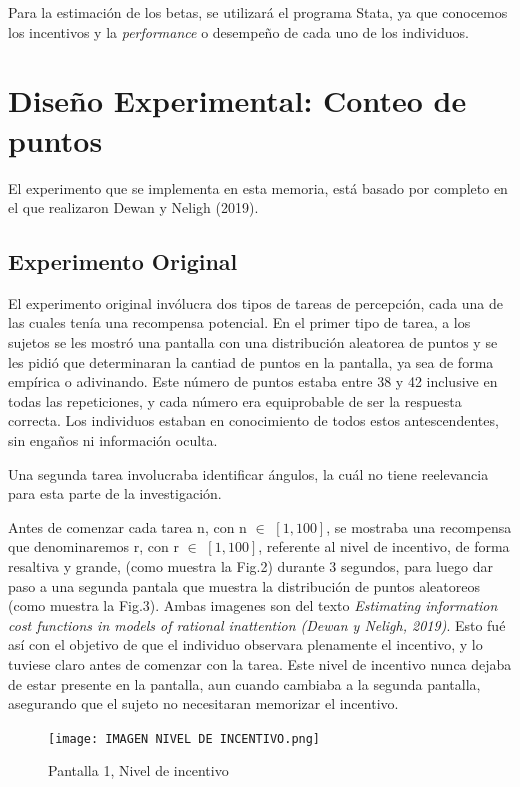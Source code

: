 \documentclass[11pt,letterpaper]{article}
\begin{document}
Para la estimación de los betas, se utilizará el programa Stata, ya que conocemos los incentivos y la \textit{performance} o desempeño de cada uno de los individuos.



\section{Diseño Experimental: Conteo de puntos}

El experimento que se implementa en esta memoria, está basado por completo en el que realizaron Dewan y Neligh (2019). 

\subsection{Experimento Original}

El experimento original invólucra dos tipos de tareas de percepción, cada una de las cuales tenía una recompensa potencial. En el primer tipo de tarea, a los sujetos se les mostró una pantalla con una distribución aleatorea de puntos y se les pidió que determinaran la cantiad de puntos en la pantalla, ya sea de forma empírica o adivinando. Este número de puntos estaba entre 38 y 42 inclusive en todas las repeticiones, y cada número era equiprobable de ser la respuesta correcta. Los individuos estaban en conocimiento de todos estos antescendentes, sin engaños ni información oculta.

Una segunda tarea involucraba identificar ángulos, la cuál no tiene reelevancia para esta parte de la investigación.

Antes de comenzar cada tarea n, con n $\in$ $[1,100]$, se mostraba una recompensa que denominaremos r, con r $\in$ $[1,100]$, referente al nivel de incentivo, de forma resaltiva y grande, (como muestra la Fig.2) durante 3 segundos, para luego dar paso a una segunda pantala que muestra la distribución de puntos aleatoreos (como muestra la Fig.3). Ambas imagenes son del texto \textit{Estimating information cost functions in models of rational inattention (Dewan y Neligh, 2019)}. Esto fué así con el objetivo de que el individuo observara plenamente el incentivo, y lo tuviese claro antes de comenzar con la tarea. Este nivel de incentivo nunca dejaba de estar presente en la pantalla, aun cuando cambiaba a la segunda pantalla, asegurando que el sujeto no necesitaran memorizar el incentivo.


    \begin{figure}[h]
        \centering
        \texttt{[image: IMAGEN NIVEL DE INCENTIVO.png]}
        \caption{Pantalla 1, Nivel de incentivo}
    \end{figure}
\end{document}
